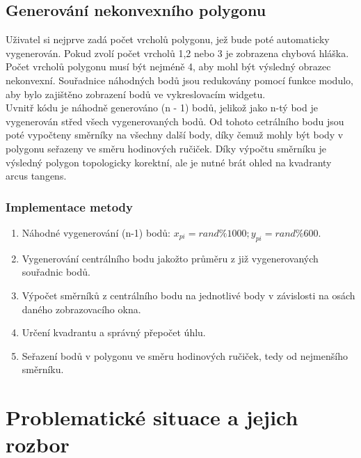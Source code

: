 \documentclass[a4paper,11pt,twoside]{article}
\begin{document}
\subsection{Generování nekonvexního polygonu}
Uživatel si nejprve zadá počet vrcholů polygonu, jež bude poté automaticky vygenerován. Pokud zvolí počet vrcholů 1,2 nebo 3 je zobrazena chybová hláška. Počet vrcholů polygonu musí být nejméně 4, aby mohl být výsledný obrazec nekonvexní. 
Souřadnice náhodných bodů jsou redukovány pomocí funkce modulo, aby bylo zajištěno zobrazení bodů ve vykreslovacím widgetu.\\
\indent Uvnitř kódu je náhodně generováno (n - 1) bodů, jelikož jako n-tý bod je vygenerován střed všech vygenerovaných bodů. Od tohoto cetrálního bodu jsou poté vypočteny směrníky na všechny další body, díky čemuž mohly být body v polygonu seřazeny ve směru hodinových ručiček. Díky výpočtu směrníku je výsledný polygon topologicky korektní, ale je nutné brát ohled na kvadranty arcus tangens.

\subsubsection{Implementace metody}
\begin{enumerate}
\item Náhodné vygenerování (n-1) bodů:  $x_{pi} = rand \% 1000; y_{pi} = rand \% 600$.
\item Vygenerování centrálního bodu jakožto průměru z již vygenerovaných souřadnic bodů.
\item Výpočet směrníků z centrálního bodu na jednotlivé body v závislosti na osách daného zobrazovacího okna.
\item Určení kvadrantu a správný přepočet úhlu.
\item Seřazení bodů v polygonu ve směru hodinových ručiček, tedy od nejmenšího směrníku.
\end{enumerate}

\newpage
\vspace*{-1cm}
\section{Problematické situace a jejich rozbor}
\end{document}
